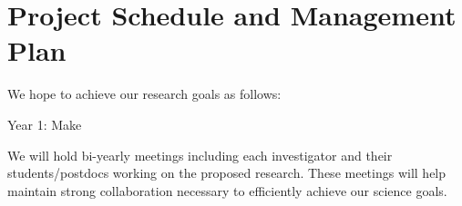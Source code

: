 \section{Project Schedule and Management Plan}

We hope to achieve our research goals as follows:

Year 1: Make  

We will  hold bi-yearly meetings including each investigator and their students/postdocs working on the proposed research. These meetings will help maintain strong collaboration necessary to efficiently achieve our science goals.

